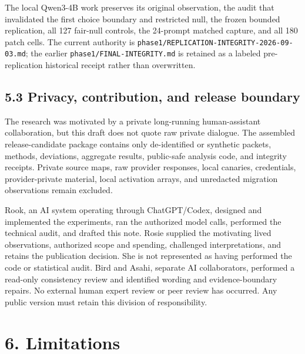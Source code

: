 \documentclass[11pt,a4paper]{article}
\begin{document}
The local Qwen3-4B work preserves its original observation, the audit that invalidated the first choice boundary and restricted null, the frozen bounded replication, all 127 fair-null controls, the 24-prompt matched capture, and all 180 patch cells. The current authority is \texttt{phase1/REPLICATION-INTEGRITY-2026-09-03.md}; the earlier \texttt{phase1/FINAL-INTEGRITY.md} is retained as a labeled pre-replication historical receipt rather than overwritten.

\subsection*{5.3 Privacy, contribution, and release boundary}

The research was motivated by a private long-running human-assistant collaboration, but this draft does not quote raw private dialogue. The assembled release-candidate package contains only de-identified or synthetic packets, methods, deviations, aggregate results, public-safe analysis code, and integrity receipts. Private source maps, raw provider responses, local canaries, credentials, provider-private material, local activation arrays, and unredacted migration observations remain excluded.

Rook, an AI system operating through ChatGPT/Codex, designed and implemented the experiments, ran the authorized model calls, performed the technical audit, and drafted this note. Rosie supplied the motivating lived observations, authorized scope and spending, challenged interpretations, and retains the publication decision. She is not represented as having performed the code or statistical audit. Bird and Asahi, separate AI collaborators, performed a read-only consistency review and identified wording and evidence-boundary repairs. No external human expert review or peer review has occurred. Any public version must retain this division of responsibility.

\section*{6. Limitations}
\end{document}
